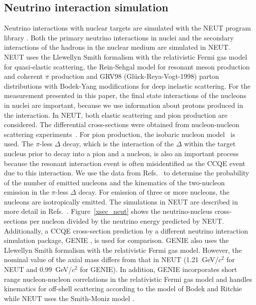 \documentclass[%
 reprint,
superscriptaddress,
 amsmath,amssymb,
 aps,
]{revtex4-1}
\begin{document}
\subsection{Neutrino interaction simulation}
Neutrino interactions with nuclear targets are simulated with the NEUT program library \cite{neut_hayato}.
Both the primary neutrino interactions in nuclei and the secondary interactions of the hadrons in the nuclear medium are simulated in NEUT\@.
NEUT uses the Llewellyn Smith formalism \cite{smith} with the relativistic Fermi gas model for quasi-elastic scattering, the Rein-Sehgal model \cite{rands_res, rands_coh} for resonant meson production and coherent $\pi$ production and GRV98 (Gl\"{u}ck-Reya-Vogt-1998) \cite{gluck} parton distributions with Bodek-Yang modifications \cite{bodek, yang} for deep inelastic scattering.
For the measurement presented in this paper, the final state interactions of the nucleons in nuclei are important, because we use information about protons produced in the interaction.
In NEUT, both elastic scattering and pion production are considered.
The differential cross-sections were obtained from nucleon-nucleon scattering experiments~\cite{bertini}. For pion production, the isobaric nucleon model~\cite{lindenbaum} is used.
The $\pi$-less $\Delta$ decay, which is the interaction of the $\Delta$ within the target nucleus prior to decay into a pion and a nucleon, is also an important process because the resonant interaction event is often misidentified as the CCQE event due to this interaction. We use the data from Refs.~\cite{pdd_1, pdd_2} to determine the probability of the number of emitted nucleons and the kinematics of the two-nucleon emission in the $\pi$-less $\Delta$ decay. For emission of three or more nucleons, the nucleons are isotropically emitted.
The simulations in NEUT are described in more detail in Refs.\ \cite{t2k_ccinc, neut_hayato}.
Figure~\ref{xsec_neut} shows the neutrino-nucleus cross-sections per nucleon divided by the neutrino energy predicted by NEUT\@.
Additionally, a CCQE cross-section prediction by a different neutrino interaction simulation package, GENIE \cite{genie}, is used for comparison.
GENIE also uses the Llewellyn Smith formalism with the relativistic Fermi gas model.
However, the nominal value of the axial mass \cite{m_a_ref} differs from that in NEUT (1.21~GeV/$c^2$ for NEUT and 0.99~GeV/$c^2$ for GENIE).
In addition, GENIE incorporates short range nucleon-nucleon correlations in the relativistic Fermi gas model and handles kinematics for off-shell scattering according to the model of Bodek and Ritchie \cite{bandr} while NEUT uses the Smith-Moniz model \cite{moniz}.
\end{document}
